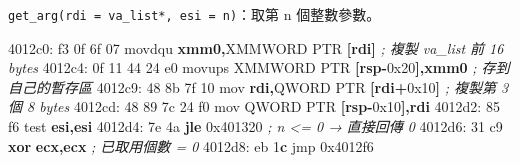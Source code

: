 \documentclass[10pt,a4paper]{article}
\newenvironment{Shaded}{\begin{snugshade}}{\end{snugshade}}
\newcommand{\BaseNTok}[1]{\textcolor[rgb]{0.00,0.00,0.81}{#1}}
\newcommand{\BuiltInTok}[1]{#1}
\newcommand{\CommentTok}[1]{\textcolor[rgb]{0.56,0.35,0.01}{\textit{#1}}}
\newcommand{\ControlFlowTok}[1]{\textcolor[rgb]{0.13,0.29,0.53}{\textbf{#1}}}
\newcommand{\DataTypeTok}[1]{\textcolor[rgb]{0.13,0.29,0.53}{#1}}
\newcommand{\DecValTok}[1]{\textcolor[rgb]{0.00,0.00,0.81}{#1}}
\newcommand{\ErrorTok}[1]{\textcolor[rgb]{0.64,0.00,0.00}{\textbf{#1}}}
\newcommand{\FloatTok}[1]{\textcolor[rgb]{0.00,0.00,0.81}{#1}}
\newcommand{\KeywordTok}[1]{\textcolor[rgb]{0.13,0.29,0.53}{\textbf{#1}}}
\newcommand{\NormalTok}[1]{#1}
\newcommand{\OperatorTok}[1]{\textcolor[rgb]{0.81,0.36,0.00}{\textbf{#1}}}
\renewenvironment{Shaded}{%
  \def\FrameCommand{\fboxsep=3.2pt\colorbox{shadecolor}}%
  \MakeFramed{\advance\hsize-\width\FrameRestore\small}%
}{%
  \endMakeFramed
}
\begin{document}
\texttt{get\_\allowbreak{}arg(rdi\ \allowbreak{}=\ \allowbreak{}va\_\allowbreak{}list*,\allowbreak{}\ \allowbreak{}esi\ \allowbreak{}=\ \allowbreak{}n)}：取第 n 個整數參數。

\begin{Shaded}
\begin{Highlighting}[]
\NormalTok{  4012c0: f3 }\FloatTok{0}\BaseNTok{f} \FloatTok{6}\BaseNTok{f} \DecValTok{07}\NormalTok{        movdqu }\KeywordTok{xmm0}\OperatorTok{,}\NormalTok{XMMWORD }\DataTypeTok{PTR} \OperatorTok{[}\KeywordTok{rdi}\OperatorTok{]}   \CommentTok{; 複製 va\_list 前 16 bytes}
\NormalTok{  4012c4: 0f 11 44 24 e0     movups XMMWORD }\DataTypeTok{PTR} \OperatorTok{[}\KeywordTok{rsp}\OperatorTok{{-}}\BaseNTok{0x20}\OperatorTok{],}\KeywordTok{xmm0}  \CommentTok{; 存到自己的暫存區}
\NormalTok{  4012c9: 48 8b 7f 10        }\BuiltInTok{mov}    \KeywordTok{rdi}\OperatorTok{,}\DataTypeTok{QWORD} \DataTypeTok{PTR} \OperatorTok{[}\KeywordTok{rdi}\OperatorTok{+}\BaseNTok{0x10}\OperatorTok{]} \CommentTok{; 複製第 3 個 8 bytes}
\NormalTok{  4012cd: 48 89 7c 24 f0     mov    }\DataTypeTok{QWORD} \DataTypeTok{PTR} \OperatorTok{[}\KeywordTok{rsp}\OperatorTok{{-}}\BaseNTok{0x10}\OperatorTok{],}\KeywordTok{rdi}
\NormalTok{  4012d2: 85 f6              test   }\KeywordTok{esi}\OperatorTok{,}\KeywordTok{esi}
\NormalTok{  4012d4: 7e 4a              }\ControlFlowTok{jle}    \BaseNTok{0x401320}        \CommentTok{; n \textless{}= 0 → 直接回傳 0}
\NormalTok{  4012d6: 31 c9              }\OperatorTok{xor}    \KeywordTok{ecx}\OperatorTok{,}\KeywordTok{ecx}         \CommentTok{; 已取用個數 = 0}
\NormalTok{  4012d8: eb }\DecValTok{1}\ErrorTok{c}\NormalTok{              jmp    }\BaseNTok{0x4012f6}


\end{Highlighting}
\end{Shaded}
\end{document}
